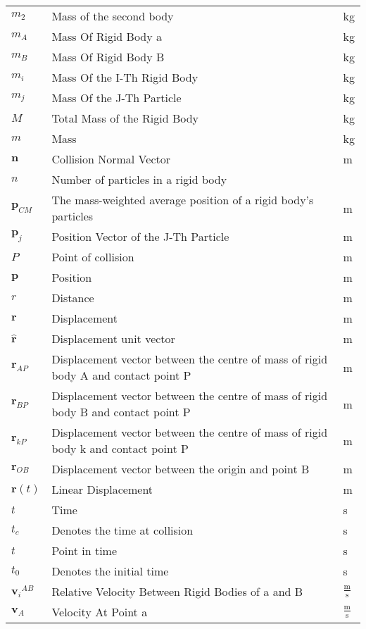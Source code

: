 \documentclass[12pt]{article}
\begin{document}
\begin{longtabu}{l X[l] l}
\\
${m_{2}}$ & Mass of the second body & kg
\\
${m_{A}}$ & Mass Of Rigid Body a & kg
\\
${m_{B}}$ & Mass Of Rigid Body B & kg
\\
${m_{i}}$ & Mass Of the I-Th Rigid Body & kg
\\
${m_{j}}$ & Mass Of the J-Th Particle & kg
\\
$M$ & Total Mass of the Rigid Body & kg
\\
$m$ & Mass & kg
\\
$\mathbf{n}$ & Collision Normal Vector & m
\\
$n$ & Number of particles in a rigid body & 
\\
${\mathbf{p}_{CM}}$ & The mass-weighted average position of a rigid body's particles & m
\\
${\mathbf{p}_{j}}$ & Position Vector of the J-Th Particle & m
\\
$P$ & Point of collision & m
\\
$\mathbf{p}$ & Position & m
\\
$r$ & Distance & m
\\
$\mathbf{r}$ & Displacement & m
\\
$\mathbf{\hat{r}}$ & Displacement unit vector & m
\\
${\mathbf{r}_{AP}}$ & Displacement vector between the centre of mass of rigid body A and contact point P & m
\\
${\mathbf{r}_{BP}}$ & Displacement vector between the centre of mass of rigid body B and contact point P & m
\\
${\mathbf{r}_{kP}}$ & Displacement vector between the centre of mass of rigid body k and contact point P & m
\\
${\mathbf{r}_{OB}}$ & Displacement vector between the origin and point B & m
\\
$\mathbf{r}(t)$ & Linear Displacement & m
\\
$t$ & Time & s
\\
${t_{c}}$ & Denotes the time at collision & s
\\
$t$ & Point in time & s
\\
${t_{0}}$ & Denotes the initial time & s
\\
${{\mathbf{v}_{i}}^{AB}}$ & Relative Velocity Between Rigid Bodies of a and B & $\frac{\text{m}}{\text{s}}$
\\
${\mathbf{v}_{A}}$ & Velocity At Point a & $\frac{\text{m}}{\text{s}}$
\\

\end{longtabu}
\end{document}
